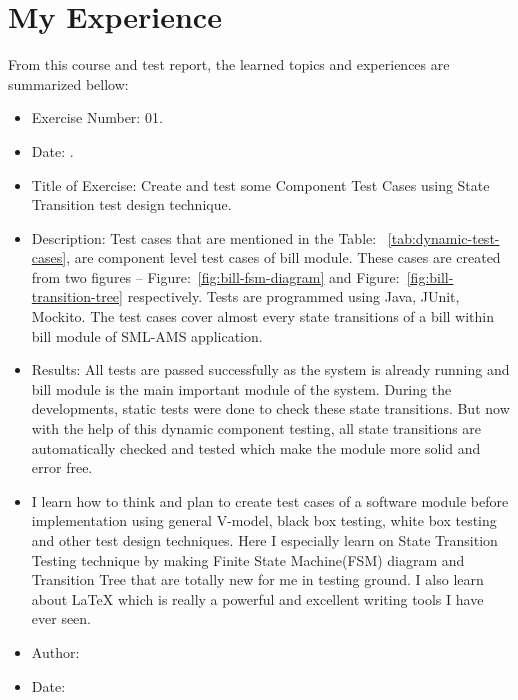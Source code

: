 \documentclass[12pt]{article}
\makeatletter
\let\theauthor\@author
\let\thedate\@date
\makeatother
\begin{document}
\section{My Experience}
From this course and test report, the learned topics and experiences are summarized bellow: %

\begin{itemize}
	
    \item Exercise Number: 01.
    
    \item Date: \thedate.

	\item Title of Exercise: Create and test some Component Test Cases using State Transition test design technique.
    
    \item Description: Test cases that are mentioned in the Table: ~\ref{tab:dynamic-test-cases}, are component level test cases of bill module. These cases are created from two figures \--- Figure:~\ref{fig:bill-fsm-diagram} and Figure:~\ref{fig:bill-transition-tree} respectively. Tests are programmed using Java, JUnit, Mockito. The test cases cover almost every state transitions of a bill within bill module of SML-AMS application.
    
    \item Results: All tests are passed successfully as the system is already running and bill module is the main important module of the system. During the developments, static tests were done to check these state transitions. But now with the help of this dynamic component testing, all state transitions are automatically checked and tested which make the module more solid and error free.

	\item I learn how to think and plan to create test cases of a software module before implementation using general V-model, black box testing, white box testing and other test design techniques. Here I especially learn on State Transition Testing technique by making Finite State Machine(FSM) diagram and Transition Tree that are totally new for me in testing ground. I also learn about LaTeX which is really a powerful and excellent writing tools I have ever seen. 

	\item Author: \theauthor 
    
    \item Date: \thedate
    
\end{itemize}
\end{document}

